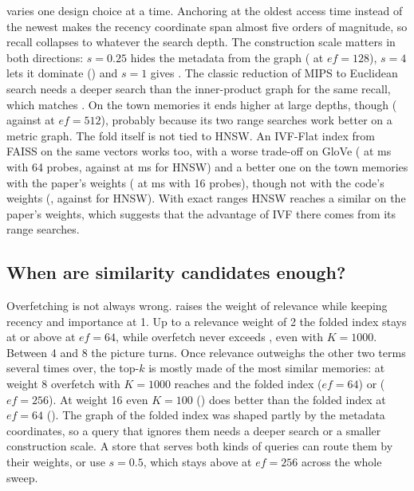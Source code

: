 \documentclass[11pt,a4paper]{article}
\begin{document}
 varies one design choice at a time. Anchoring at the oldest access time instead of the newest makes the recency coordinate span almost five orders of magnitude, so recall collapses to \AbOldAnchor{} whatever the search depth. The construction scale matters in both directions: $s=0.25$ hides the metadata from the graph (\AbSQuarter{} at $ef=128$), $s=4$ lets it dominate (\AbSFour{}) and $s=1$ gives \AbSOne{}. The classic reduction of MIPS to Euclidean search \citep{bachrach2014xbox} needs a deeper search than the inner-product graph for the same recall, which matches \citet{morozov2018ipnsw}. On the town memories it ends higher at large depths, though (\TwLtwoDeep{} against \TwIpDeep{} at $ef=512$), probably because its two range searches work better on a metric graph. The fold itself is not tied to HNSW. An IVF-Flat index from FAISS on the same vectors works too, with a worse trade-off on GloVe (\AbIvfRecall{} at \AbIvfMs{} ms with 64 probes, against \AbSOne{} at \AbOursMs{} ms for HNSW) and a better one on the town memories with the paper's weights (\TwIvfRecall{} at \TwIvfMs{} ms with 16 probes), though not with the code's weights (\TwIvfCodeRecall{}, against \TwOursCodeRecall{} for HNSW). With exact ranges HNSW reaches a similar \TwOursExactNorm{} on the paper's weights, which suggests that the advantage of IVF there comes from its range searches.

\subsection{When are similarity candidates enough?}
\label{sec:relsweep}

Overfetching is not always wrong.  raises the weight of relevance while keeping recency and importance at 1. Up to a relevance weight of 2 the folded index stays at or above \RsLowFoldedMin{} at $ef=64$, while overfetch never exceeds \RsLowRerankMax{}, even with $K=1000$. Between 4 and 8 the picture turns. Once relevance outweighs the other two terms several times over, the top-$k$ is mostly made of the most similar memories: at weight 8 overfetch with $K=1000$ reaches \RsEightRerankK{} and the folded index \RsEightFolded{} ($ef=64$) or \RsEightFoldedDeep{} ($ef=256$). At weight 16 even $K=100$ (\RsSixteenRerank{}) does better than the folded index at $ef=64$ (\RsSixteenFolded{}). The graph of the folded index was shaped partly by the metadata coordinates, so a query that ignores them needs a deeper search or a smaller construction scale. A store that serves both kinds of queries can route them by their weights, or use $s=0.5$, which stays above \RsHalfMin{} at $ef=256$ across the whole sweep.
\end{document}
